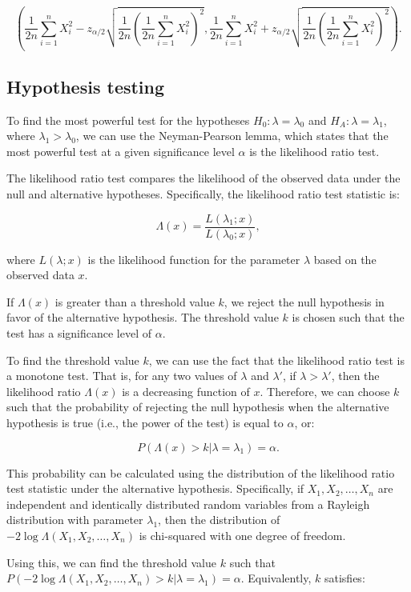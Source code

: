 \documentclass[11pt]{article}
\begin{document}
$$ \left(\frac{1}{2n}\sum_{i=1}^n X_i^2 - z_{\alpha/2}\sqrt{\frac{1}{2n}\left(\frac{1}{2n}\sum_{i=1}^n X_i^2\right)^2}, \frac{1}{2n}\sum_{i=1}^n X_i^2 + z_{\alpha/2}\sqrt{\frac{1}{2n}\left(\frac{1}{2n}\sum_{i=1}^n X_i^2\right)^2}\right). $$

\subsection*{Hypothesis testing}
To find the most powerful test for the hypotheses $H_0: \lambda=\lambda_0$ and $H_A: \lambda=\lambda_1$, where $\lambda_1>\lambda_0$, we can use the Neyman-Pearson lemma, which states that the most powerful test at a given significance level $\alpha$ is the likelihood ratio test.

The likelihood ratio test compares the likelihood of the observed data under the null and alternative hypotheses. Specifically, the likelihood ratio test statistic is:

$$ \Lambda(x) = \frac{L(\lambda_1;x)}{L(\lambda_0;x)}, $$

where $L(\lambda;x)$ is the likelihood function for the parameter $\lambda$ based on the observed data $x$.

If $\Lambda(x)$ is greater than a threshold value $k$, we reject the null hypothesis in favor of the alternative hypothesis. The threshold value $k$ is chosen such that the test has a significance level of $\alpha$.

To find the threshold value $k$, we can use the fact that the likelihood ratio test is a monotone test. That is, for any two values of $\lambda$ and $\lambda'$, if $\lambda>\lambda'$, then the likelihood ratio $\Lambda(x)$ is a decreasing function of $x$. Therefore, we can choose $k$ such that the probability of rejecting the null hypothesis when the alternative hypothesis is true (i.e., the power of the test) is equal to $\alpha$, or:

$$ P(\Lambda(x) > k | \lambda = \lambda_1) = \alpha. $$

This probability can be calculated using the distribution of the likelihood ratio test statistic under the alternative hypothesis. Specifically, if $X_1, X_2, \ldots, X_n$ are independent and identically distributed random variables from a Rayleigh distribution with parameter $\lambda_1$, then the distribution of $-2\log\Lambda(X_1,X_2,\ldots,X_n)$ is chi-squared with one degree of freedom.

Using this, we can find the threshold value $k$ such that $P(-2\log\Lambda(X_1,X_2,\ldots,X_n) > k | \lambda = \lambda_1) = \alpha$. Equivalently, $k$ satisfies:
\end{document}
